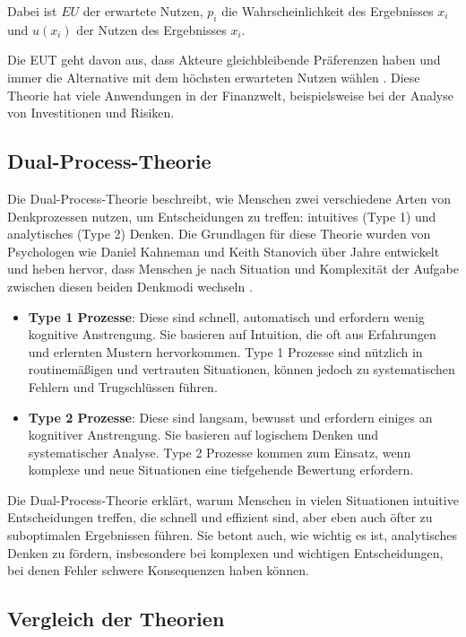 Dabei ist \( EU \) der erwartete Nutzen, \( p_i \) die Wahrscheinlichkeit des Ergebnisses \( x_i \) und \( u(x_i) \) der Nutzen des Ergebnisses \( x_i \).

Die EUT geht davon aus, dass Akteure gleichbleibende Präferenzen haben und immer die Alternative mit dem höchsten erwarteten Nutzen wählen \cite{vonNeumann1944}. Diese Theorie hat viele Anwendungen in der Finanzwelt, beispielsweise bei der Analyse von Investitionen und Risiken.

\subsection{Dual-Process-Theorie}

Die Dual-Process-Theorie beschreibt, wie Menschen zwei verschiedene Arten von Denkprozessen nutzen, um Entscheidungen zu treffen: intuitives (Type 1) und analytisches (Type 2) Denken. Die Grundlagen für diese Theorie wurden von Psychologen wie Daniel Kahneman und Keith Stanovich über Jahre entwickelt und heben hervor, dass Menschen je nach Situation und Komplexität der Aufgabe zwischen diesen beiden Denkmodi wechseln \cite{Tversky74}.

\begin{itemize}
    \item \textbf{Type 1 Prozesse}: Diese sind schnell, automatisch und erfordern wenig kognitive Anstrengung. Sie basieren auf Intuition, die oft aus Erfahrungen und erlernten Mustern hervorkommen. Type 1 Prozesse sind nützlich in routinemäßigen und vertrauten Situationen, können jedoch zu systematischen Fehlern und Trugschlüssen führen.
    \item \textbf{Type 2 Prozesse}: Diese sind langsam, bewusst und erfordern einiges an kognitiver Anstrengung. Sie basieren auf logischem Denken und systematischer Analyse. Type 2 Prozesse kommen zum Einsatz, wenn komplexe und neue Situationen eine tiefgehende Bewertung erfordern.
\end{itemize}

Die Dual-Process-Theorie erklärt, warum Menschen in vielen Situationen intuitive Entscheidungen treffen, die schnell und effizient sind, aber eben auch öfter zu suboptimalen Ergebnissen führen. Sie betont auch, wie wichtig es ist, analytisches Denken zu fördern, insbesondere bei komplexen und wichtigen Entscheidungen, bei denen Fehler schwere Konsequenzen haben können.

\subsection{Vergleich der Theorien}

